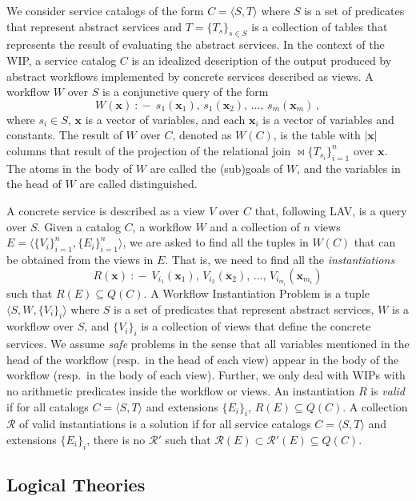 \documentclass{llncs}
\newcommand{\tup}[1]{\langle #1 \rangle}
\newcommand{\vvec}[1]{\mathbf{#1}}
\newcommand{\join}{\bowtie}
\newcommand{\R}{\mathcal{R}}
\newcommand{\qrule}{:\!\!-}
\begin{document}
We consider service catalogs of the form $C=\tup{S,T}$ where $S$ is a set
of predicates that represent abstract services and $T=\{T_s\}_{s\in S}$ is
a collection of tables that represents the result of evaluating the abstract
services. In the context of the WIP, a service catalog $C$ is an idealized
description of the output produced by abstract workflows implemented by
concrete services described as views.
A workflow $W$ over $S$ is a conjunctive query of the form 
\[ W(\vvec{x})\ \qrule\ s_1(\vvec{x}_1),\,s_1(\vvec{x}_2),\,\ldots,\,s_m(\vvec{x}_m)\,, \]
where $s_i\in S$, $\vvec{x}$ is a vector of variables, and each $\vvec{x}_i$
is a vector of variables and constants. The result of $W$ over $C$, denoted
as $W(C)$, is the table with $|\vvec{x}|$ columns that result of the projection
of the relational join $\join\!\!\{T_{s_i}\}_{i=1}^n$ over $\vvec{x}$.
The atoms in the body of $W$ are called the (sub)goals of $W$, and the variables
in the head of $W$ are called distinguished.

A concrete service is described as a view $V$ over $C$ that, following LAV, is
a query over $S$. Given a catalog $C$, a workflow $W$ and a collection of $n$ views
$E=\tup{\{V_i\}_{i=1}^n,\{E_i\}_{i=1}^n}$, we are asked to find all the tuples in $W(C)$
that can be obtained from the views in $E$. That is, we need to find all the
\emph{instantiations}
\[ R(\vvec{x})\ \qrule\ V_{i_1}(\vvec{x}_1),\,V_{i_2}(\vvec{x}_2),\,\ldots,\,V_{i_{m_i}}(\vvec{x}_{m_i}) \]
such that $R(E) \subseteq Q(C)$.
A Workflow Instantiation Problem is a tuple $\tup{S,W,\{V_i\}_i}$ where $S$
is a set of predicates that represent abstract services, $W$ is a workflow over
$S$, and $\{V_i\}_i$ is a collection of views that define the concrete services.
We assume \emph{safe} problems in the sense that all variables mentioned in the
head of the workflow (resp.\ in the head of each view) appear in the body of the
workflow (resp.\ in the body of each view).
Further, we only deal with WIPs with no arithmetic predicates inside the workflow
or views. An instantiation $R$ is \emph{valid} if for all catalogs $C=\tup{S,T}$
and extensions $\{E_i\}_i$, $R(E)\subseteq Q(C)$. A collection $\R$ of valid
instantiations is a solution if for all service catalogs $C=\tup{S,T}$ and
extensions $\{E_i\}_i$, there is no $\R'$ such that $\R(E)\subset\R'(E)\subseteq Q(C)$.

\subsection{Logical Theories}
\end{document}

